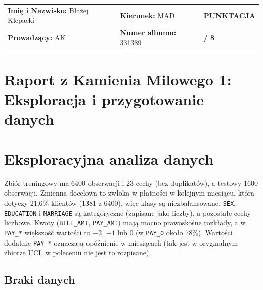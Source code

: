 \documentclass[a4paper,10pt]{article}
\begin{document}
\vspace{-1em}
\noindent
\renewcommand{\arraystretch}{1.3}
\begin{tabularx}{\textwidth}{|>{\hsize=1.2\hsize}X|>{\hsize=0.8\hsize}X|>{\centering\arraybackslash}m{2.5cm}|}
\hline
\rowcolor{tableheader}


\textbf{Imię i Nazwisko:} Błażej Klepacki
& \textbf{Kierunek:} MAD %
& \cellcolor{scorebg}\textbf{PUNKTACJA} \\
\rowcolor{tableheader}
\textbf{Prowadzący:}  AK %
& \textbf{Numer albumu:} 331389 
& \cellcolor{scorebg}\huge{\textbf{ / 8}} \\
\hline
\end{tabularx}
\renewcommand{\arraystretch}{1.0}

\vspace{-1em}


\section*{\color{primaryblue}Raport z Kamienia Milowego 1: Eksploracja i przygotowanie danych}


\section{Eksploracyjna analiza danych}

Zbiór treningowy ma 6400 obserwacji i 23 cechy (bez duplikatów), a testowy 1600 obserwacji. Zmienna docelowa to zwłoka w płatności w kolejnym miesiącu, która dotyczy 21,6\% klientów (1381 z 6400), więc klasy są niezbalansowane. \texttt{SEX}, \texttt{EDUCATION} i \texttt{MARRIAGE} są kategoryczne (zapisane jako liczby), a pozostałe cechy liczbowe. Kwoty (\texttt{BILL\_AMT}, \texttt{PAY\_AMT}) mają mocno prawoskośne rozkłady, a w \texttt{PAY\_*} większość wartości to $-2$, $-1$ lub $0$ (w \texttt{PAY\_0} około 78\%). Wartości dodatnie \texttt{PAY\_*} oznaczają opóźnienie w miesiącach (tak jest w oryginalnym zbiorze UCI, w poleceniu nie jest to rozpisane).

\subsection{Braki danych}
\end{document}
